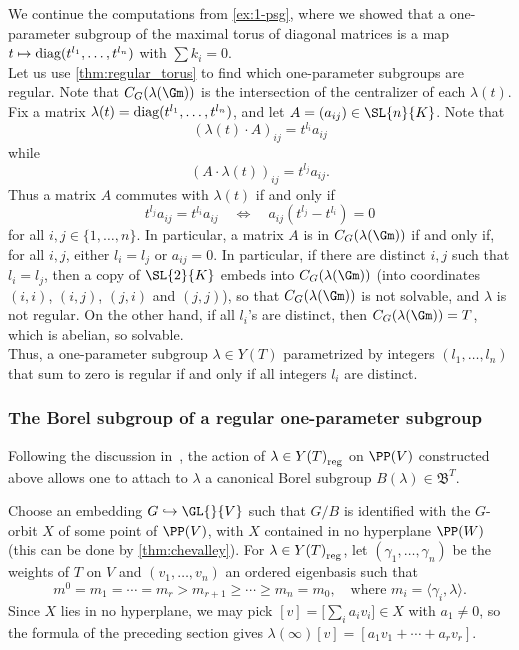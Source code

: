 \begin{exmp}\label{ex:reg-1psg}
    We continue the computations from \cref{ex:1-psg}, where we showed that a one-parameter subgroup of the maximal torus of diagonal matrices is a map $t \mapsto \textnormal{diag}(t^{l_1}, \ldots, t^{l_n})$ with $\sum k_i = 0$. \\
    Let us use \cref{thm:regular_torus} to find which one-parameter subgroups are regular. Note that $C_G(\lambda(\Gm))$ is the intersection of the centralizer of each $\lambda(t)$. \\
    Fix a matrix $\lambda(t) = \textnormal{diag}(t^{l_1}, \ldots, t^{l_n})$, and let $A = (a_{ij}) \in \SL{n}{K}$. Note that 
    \[ {(\lambda(t) \cdot A )}_{ij} = t^{l_i} a_{ij} \]
    while 
    \[ {(A \cdot \lambda(t))}_{ij} = t^{l_j} a_{ij}. \]
    Thus a matrix $A$ commutes with $\lambda(t)$ if and only if
    \[ t^{l_j} a_{ij} = t^{l_i} a_{ij} \quad \iff \quad a_{ij} (t^{l_j} - t^{l_i}) = 0 \]
    for all $i, j \in \{1, \ldots, n \}$. In particular, a matrix $A$ is in $C_G(\lambda(\Gm))$ if and only if, for all $i,j$, either $l_i = l_j$ or $a_{ij} = 0$. In particular, if there are distinct $i,j$ such that $l_i = l_j$, then a copy of $\SL{2}{K}$ embeds into $C_G(\lambda(\Gm))$ (into coordinates $(i,i)$, $(i, j)$, $(j,i)$ and $(j,j)$), so that $C_G(\lambda(\Gm))$ is not solvable, and $\lambda$ is not regular. On the other hand, if all $l_i$'s are distinct, then $C_G(\lambda(\Gm)) = T$, which is abelian, so solvable. \\
    Thus, a one-parameter subgroup $\lambda \in Y(T)$ parametrized by integers $(l_1, \ldots, l_n)$ that sum to zero is regular if and only if all integers $l_i$ are distinct.
\end{exmp}

\subsubsection{The Borel subgroup of a regular one-parameter subgroup}

Following the discussion in~\cite[Section~25.4]{humphreys_linear_1975}, the action of $\lambda \in {Y(T)}_{\textnormal{reg}}$ on $\PP(V)$ constructed above allows one to attach to $\lambda$ a canonical Borel subgroup $B(\lambda) \in \mathfrak{B}^T$.

Choose an embedding $G \hookrightarrow \GL{}{V}$ such that $G/B$ is identified with the $G$-orbit $X$ of some point of $\PP(V)$, with $X$ contained in no hyperplane $\PP(W)$ (this can be done by \cref{thm:chevalley}). For $\lambda \in {Y(T)}_{\textnormal{reg}}$, let $(\gamma_1, \ldots, \gamma_n)$ be the weights of $T$ on $V$ and $(v_1, \ldots, v_n)$ an ordered eigenbasis such that
\[ m^0 = m_1 = \cdots = m_r > m_{r+1} \geq \cdots \geq m_n = m_0, \quad \text{where } m_i = \langle \gamma_i, \lambda \rangle. \]
Since $X$ lies in no hyperplane, we may pick $[v] = \bigl[\sum_i a_i v_i\bigr] \in X$ with $a_1 \neq 0$, so the formula of the preceding section gives $\lambda(\infty)[v] = [a_1 v_1 + \cdots + a_r v_r]$.

